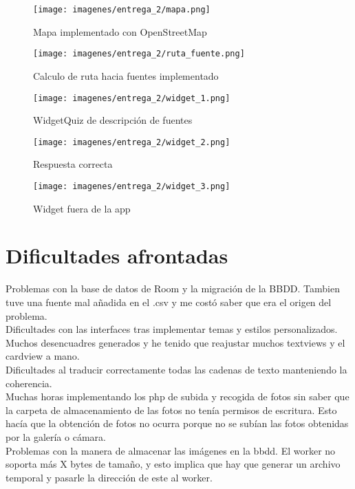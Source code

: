 \documentclass[11pt,a4paper]{article}
\begin{document}
\begin{figure}[H]
    \centering
    \texttt{[image: imagenes/entrega\_2/mapa.png]}
    \caption{Mapa implementado con OpenStreetMap}
    \label{mapa}
\end{figure}
\begin{figure}[H]
    \centering
    \texttt{[image: imagenes/entrega\_2/ruta\_fuente.png]}
    \caption{Calculo de ruta hacia fuentes implementado}
    \label{ruta}
\end{figure}

\begin{figure}[H]
    \centering
    \texttt{[image: imagenes/entrega\_2/widget\_1.png]}
    \caption{WidgetQuiz de descripción de fuentes}
    \label{wid1}
\end{figure}
\begin{figure}[H]
    \centering
    \texttt{[image: imagenes/entrega\_2/widget\_2.png]}
    \caption{Respuesta correcta}
    \label{wid2}
\end{figure}
\begin{figure}[H]
    \centering
    \texttt{[image: imagenes/entrega\_2/widget\_3.png]}
    \caption{Widget fuera de la app}
    \label{wid3}
\end{figure}

\newpage
\section{Dificultades afrontadas}

    Problemas con la base de datos de Room y la migración de la BBDD. Tambien tuve una fuente mal añadida en el .csv y me costó saber que era el origen del problema.\\
    Dificultades con las interfaces tras implementar temas y estilos personalizados. Muchos desencuadres generados y he tenido que reajustar muchos textviews y el cardview a mano.\\
    Dificultades al traducir correctamente todas las cadenas de texto manteniendo la coherencia.\\
    
    Muchas horas implementando los php de subida y recogida de fotos sin saber que la carpeta de almacenamiento de las fotos no tenía permisos de escritura. Esto hacía que la obtención de fotos no ocurra porque no se subían las fotos obtenidas por la galería o cámara.\\
    Problemas con la manera de almacenar las imágenes en la bbdd. El worker no soporta más X bytes de tamaño, y esto implica que hay que generar un archivo temporal y pasarle la dirección de este al worker. \\
\end{document}
